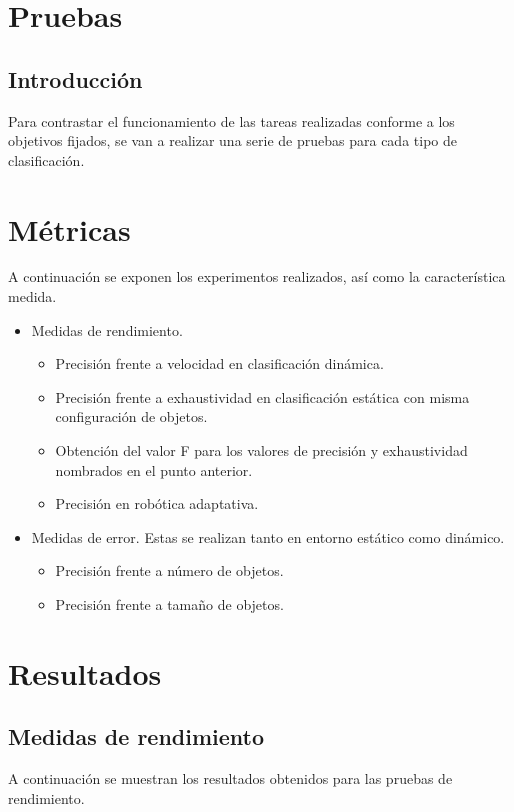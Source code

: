 \section{Pruebas}
\label{sec:pruebas}
\subsection{Introducción}
\noindent Para contrastar el funcionamiento de las tareas realizadas conforme a los objetivos fijados, se van a realizar una serie de pruebas para cada tipo de clasificación. \\

\section *{Métricas}
\noindent A continuación se exponen los experimentos realizados, así como la característica medida.

\begin{itemize}
	\item Medidas de rendimiento.
		\begin{itemize}
			\item Precisión frente a velocidad en clasificación dinámica.
			\item Precisión frente a exhaustividad en clasificación estática con misma configuración de objetos.
			\item Obtención del valor F para los valores de precisión y exhaustividad nombrados en el punto anterior.
			\item Precisión en robótica adaptativa.
		\end{itemize}
	\item Medidas de error. Estas se realizan tanto en entorno estático como dinámico.
		\begin{itemize}
			\item Precisión frente a número de objetos.
			\item Precisión frente a tamaño de objetos.
		\end{itemize}
\end{itemize}

	


\section*{Resultados}
\subsection{Medidas de rendimiento}
\noindent A continuación se muestran los resultados obtenidos para las pruebas de rendimiento. \\

